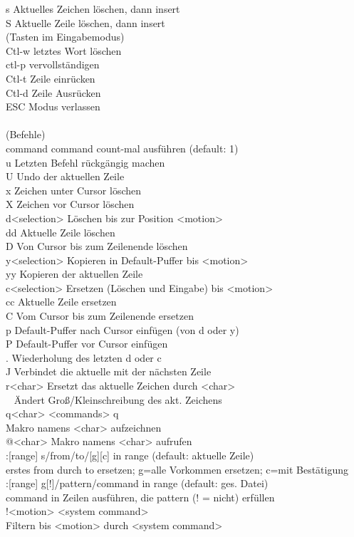 \documentclass[10pt,a4paper,twoside]{book}
\begin{document}
\begin{tabbing}
\> s	 \>	Aktuelles Zeichen löschen, dann insert\\
\> S	 \>	Aktuelle Zeile löschen, dann insert\\
(Tasten im Eingabemodus)\\
\> Ctl-w \> letztes Wort löschen\\
\> ctl-p \> vervollständigen\\
\> Ctl-t \> Zeile einrücken\\
\> Ctl-d \> Zeile Ausrücken\\
\> ESC \> Modus verlassen\\
\\
(Befehle)\\
\>[count]command		\>	command count-mal ausführen (default: 1)\\
\> u		\>		Letzten Befehl rückgängig machen\\
\> U		\>		Undo der aktuellen Zeile\\
\> x		\>		Zeichen unter Cursor löschen\\
\> X		\>		Zeichen vor Cursor löschen\\
\> d<selection>	\>		Löschen bis zur Position <motion>\\
\> dd		\>		Aktuelle Zeile löschen\\
\> D			\>	Von Cursor bis zum Zeilenende löschen\\
\> y<selection>	\>		Kopieren in Default-Puffer bis <motion>\\
\> yy			\>	Kopieren der aktuellen Zeile\\
\> c<selection>	\>		Ersetzen (Löschen und Eingabe) bis <motion>\\
\> cc		\>		Aktuelle Zeile ersetzen\\
\> C			\>	Vom Cursor bis zum Zeilenende ersetzen\\
\> p			\>	Default-Puffer nach Cursor einfügen (von d oder y)\\
\> P			\>	Default-Puffer vor Cursor einfügen\\
\> .			\>	Wiederholung des letzten d oder c\\
\> J			\>	Verbindet die aktuelle mit der nächsten Zeile\\
\> r<char>	\>			Ersetzt das aktuelle Zeichen durch <char>\\
\> ~			\>	Ändert Groß/Kleinschreibung des akt. Zeichens\\
q<char> <commands> q \\
Makro namens <char> aufzeichnen\\
\> @<char>		\>		Makro namens <char> aufrufen\\
:[range] s/from/to/[g][c]	in range (default: aktuelle Zeile)  \\
erstes from durch to ersetzen; g=alle Vorkommen ersetzen; c=mit Bestätigung\\
:[range] g[!]/pattern/command	in range (default: ges. Datei)  \\
command in Zeilen ausführen, die pattern (! = nicht) erfüllen \\
\> !<motion> <system command> \\
Filtern bis <motion> durch <system command>\\
\end{tabbing}
\end{document}
